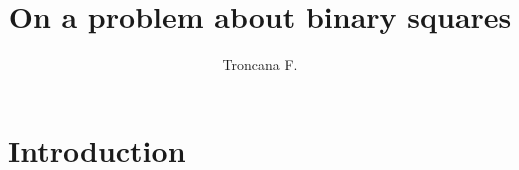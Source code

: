 \documentclass{article}
\title{On a problem about binary squares}
\author{Troncana F.}
\date{}
\begin{document}
\maketitle

\section*{Introduction}
\end{document}
